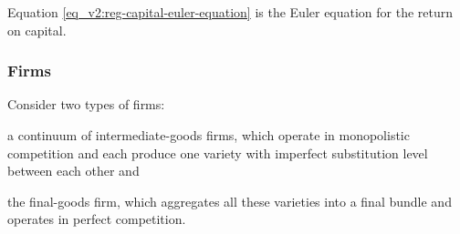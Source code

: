 \documentclass[../thesis.tex]{subfiles}
\begin{document}
Equation \ref{eq_v2:reg-capital-euler-equation} is the Euler equation for the return on capital.

\begin{comment}

	Divide \ref{eq_v2:reg-capital-euler-equation} of region one by region two:
\begin{alignat}{2}
	\frac{\mathbb{E}_{t} \left\{Q_{1, t+1} C_{1, t+1}^{\sigma} \right\}}{\mathbb{E}_{t} \left\{Q_{2, t+1} C_{2, t+1}^{\sigma} \right\}} &= \frac{\beta (1 + R_{t}) Q_{1t} C_{1t}^{\sigma}}{\beta (1 + R_{t}) Q_{2t} C_{2t}^{\sigma}} \implies \nonumber \\
	\frac{\mathbb{E}_{t} \left\{ Q_{1, t+1} C_{1, t+1}^{\sigma} \right\}}{Q_{1t} C_{1t}^{\sigma}} &= \frac{\mathbb{E}_{t} \left\{ Q_{2, t+1} C_{2, t+1}^{\sigma} \right\}}{Q_{2t} C_{2t}^{\sigma}} \label{eq_v2:reg-bonds-euler-equation-2}
\end{alignat}
	
\end{comment}


\begin{comment}

	Define the regional consumer inflation gross rate:
	\begin{align}
		\pi_{\eta t} &= \frac{Q_{\eta t}}{Q_{\eta, t-1}} \label{eq_v2:consumer-inflation}
	\end{align}

	The relation between the nominal $R_{t}$ and the real $r_{t}$ interest rates is the gross inflation rate $\pi_{t}$, given by the Fisher equation. %
	\begin{align}
		\pi_{t} = \frac{(1 + R_{t})}{(1 + r_{t})}  \label{eq_v2:fisher-equation}
	\end{align}
	
\end{comment}



\subsubsection{Firms}

Consider two types of firms: 
\begin{enumerate*}[label=(\arabic*)]
	\item a continuum of intermediate-goods firms, which operate in monopolistic competition and each produce one variety with imperfect substitution level between each other and
	\item the final-goods firm, which aggregates all these varieties into a final bundle and operates in perfect competition.
\end{enumerate*}
\end{document}
